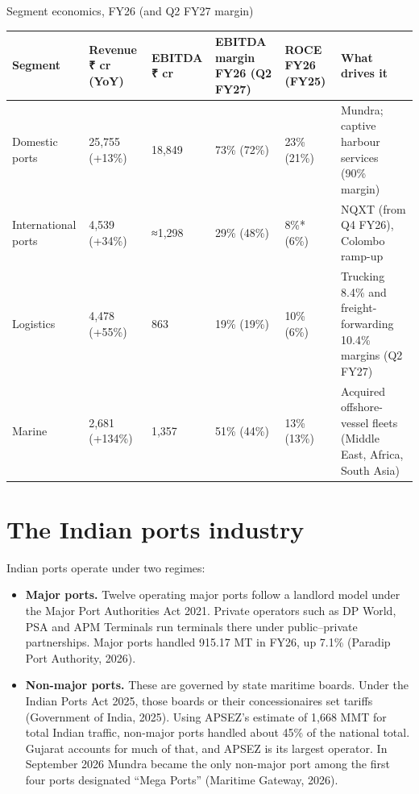\documentclass[12pt, a4paper]{article}
\newcommand{\exsource}[1]{\par\vspace{4pt}{\footnotesize\raggedright #1\par}}
\newcommand{\tablesetup}{\footnotesize\renewcommand{\arraystretch}{1.25}\setlength{\tabcolsep}{4pt}}
\newcommand{\rowsep}{\addlinespace[3pt]}
\begin{document}
\begin{exhibit}[!htbp]
\caption{Segment economics, FY26 (and Q2 FY27 margin)}\label{ex:segments}
{\tablesetup
\begin{tabularx}{\linewidth}{P{21mm}Q{20mm}Q{16mm}Q{21mm}Q{17mm}L}
\toprule
\textbf{Segment} & \textbf{Revenue ₹ cr (YoY)} & \textbf{EBITDA ₹ cr} & \textbf{EBITDA margin FY26 (Q2 FY27)} & \textbf{ROCE FY26 (FY25)} & \textbf{What drives it} \\
\midrule
Domestic ports & 25,755 (+13\%) & 18,849 & 73\% (72\%) & 23\% (21\%) & Mundra; captive harbour services (90\% margin) \\ \rowsep
International ports & 4,539 (+34\%) & ≈1,298 & 29\% (48\%) & 8\%* (6\%) & NQXT (from Q4 FY26), Colombo ramp-up \\ \rowsep
Logistics & 4,478 (+55\%) & 863 & 19\% (19\%) & 10\% (6\%) & Trucking 8.4\% and freight-forwarding 10.4\% margins (Q2 FY27) \\ \rowsep
Marine & 2,681 (+134\%) & 1,357 & 51\% (44\%) & 13\% (13\%) & Acquired offshore-vessel fleets (Middle East, Africa, South Asia) \\
\bottomrule
\end{tabularx}}
\exsource{Sources: APSEZ (2026a; 2026d). International EBITDA is derived from
the reported 28.6\% margin. *Excludes NQXT. Segment figures are before
consolidation adjustments and SEZ income.}
\end{exhibit}

\section{The Indian ports industry}\label{sec:industry}
Indian ports operate under two regimes:
\begin{itemize}
  \item \textbf{Major ports.} Twelve operating major ports follow a landlord
        model under the Major Port Authorities Act 2021. Private operators such
        as DP World, PSA and APM Terminals run terminals there under
        public--private partnerships. Major ports handled 915.17 MT in FY26, up
        7.1\% (Paradip Port Authority, 2026).
  \item \textbf{Non-major ports.} These are governed by state maritime boards.
        Under the Indian Ports Act 2025, those boards or their concessionaires
        set tariffs (Government of India, 2025). Using APSEZ's estimate of 1,668
        MMT for total Indian traffic, non-major ports handled about 45\% of the
        national total. Gujarat accounts for much of that, and APSEZ is its
        largest operator. In September 2026 Mundra became the only non-major
        port among the first four ports designated ``Mega Ports'' (Maritime
        Gateway, 2026).
\end{itemize}
\end{document}
